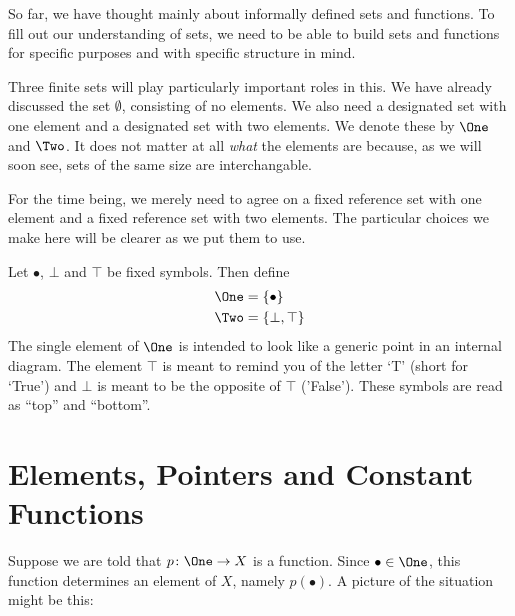 So far, we have thought mainly about informally defined sets and functions.
To fill out our understanding of sets, we need to be able to build sets and functions for specific purposes and with specific structure in mind. 

Three finite sets will play particularly important roles in this.
We have already discussed the set $\emptyset$, consisting of no elements.
We also need a designated set with one element and a designated set with two elements.
We denote these by $\One$ and $\Two$. 
It does not matter at all \emph{what} the elements are because, as we will soon see, sets of the same size are interchangable. 

For the time being, we merely need to agree on a fixed reference set with one element and a fixed reference set with two elements.
The particular choices we make here will be clearer as we put them to use.

\begin{defn}
	Let $\bullet$, $\bot$ and $\top$ be fixed symbols. Then define
	\begin{align*}
		\One &= \{\bullet\}\\
		\Two &= \{\bot,\top\}
	\end{align*} 
	The single element of $\One$ is intended to look like a generic point in an internal diagram.
	The element $\top$ is meant to remind you of the letter `T' (short for `True') and $\bot$ is meant to be the opposite of $\top$ ('False').
	These symbols are read as ``top'' and ``bottom''.
\end{defn}


\section{Elements, Pointers and Constant Functions}

Suppose we are told that $\fromto p\One X$ is a function.
Since $\bullet\in\One$, this function determines an element of $X$, namely $p(\bullet)$.
A picture of the situation might be this:


